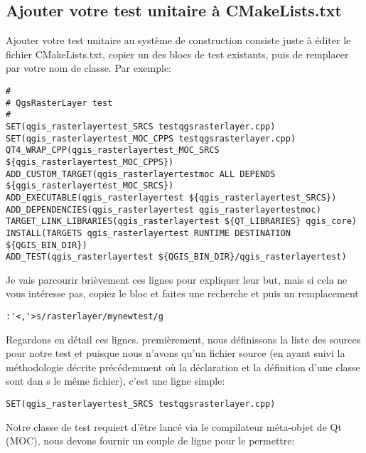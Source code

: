 \subsection{Ajouter votre test unitaire à CMakeLists.txt}
Ajouter votre test unitaire au système de construction consiste juste à éditer le fichier CMakeLists.txt, copier un des blocs de test existants, puis de remplacer par votre nom de classe. Par exemple:

\begin{verbatim}
#
# QgsRasterLayer test
#
SET(qgis_rasterlayertest_SRCS testqgsrasterlayer.cpp)
SET(qgis_rasterlayertest_MOC_CPPS testqgsrasterlayer.cpp)
QT4_WRAP_CPP(qgis_rasterlayertest_MOC_SRCS ${qgis_rasterlayertest_MOC_CPPS})
ADD_CUSTOM_TARGET(qgis_rasterlayertestmoc ALL DEPENDS ${qgis_rasterlayertest_MOC_SRCS})
ADD_EXECUTABLE(qgis_rasterlayertest ${qgis_rasterlayertest_SRCS})
ADD_DEPENDENCIES(qgis_rasterlayertest qgis_rasterlayertestmoc)
TARGET_LINK_LIBRARIES(qgis_rasterlayertest ${QT_LIBRARIES} qgis_core)
INSTALL(TARGETS qgis_rasterlayertest RUNTIME DESTINATION ${QGIS_BIN_DIR})
ADD_TEST(qgis_rasterlayertest ${QGIS_BIN_DIR}/qgis_rasterlayertest)
\end{verbatim}
Je vais parcourir brièvement ces lignes pour expliquer leur but, mais si cela ne vous intéresse pas, copiez le bloc et faites une recherche et puis un remplacement

\begin{verbatim}
:'<,'>s/rasterlayer/mynewtest/g
\end{verbatim}

Regardons en détail ces lignes. premièrement, nous définissons la liste des sources pour notre test et puisque nous n'avons qu'un fichier source (en ayant suivi la méthodologie décrite précédemment où la déclaration et la définition d'une classe sont dan s le même fichier), c'est une ligne simple:

\begin{verbatim}
SET(qgis_rasterlayertest_SRCS testqgsrasterlayer.cpp)
\end{verbatim}

Notre classe de test requiert d'être lancé via le compilateur méta-objet de Qt (MOC), nous devons fournir un couple de ligne pour le permettre:

